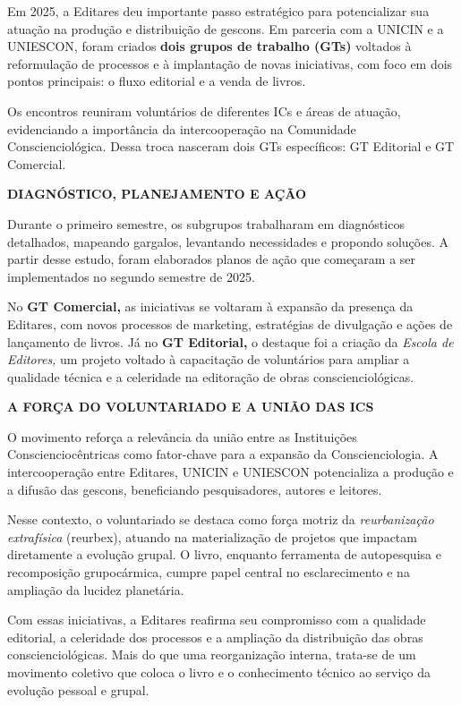 \documentclass[
]{article}
\begin{document}
Em 2025, a Editares deu importante passo estratégico para potencializar sua atuação na produção e distribuição de gescons. Em parceria com a UNICIN e a UNIESCON, foram criados \textbf{dois grupos de trabalho (GTs)} voltados à reformulação de processos e à implantação de novas iniciativas, com foco em dois pontos principais: o fluxo editorial e a venda de livros.

Os encontros reuniram voluntários de diferentes ICs e áreas de atuação, evidenciando a importância da intercooperação na Comunidade Conscienciológica. Dessa troca nasceram dois GTs específicos: GT Editorial e GT Comercial.

\textbf{DIAGNÓSTICO, PLANEJAMENTO E AÇÃO}

Durante o primeiro semestre, os subgrupos trabalharam em diagnósticos detalhados, mapeando gargalos, levantando necessidades e propondo soluções. A partir desse estudo, foram elaborados planos de ação que começaram a ser implementados no segundo semestre de 2025.

No \textbf{GT Comercial,} as iniciativas se voltaram à expansão da presença da Editares, com novos processos de marketing, estratégias de divulgação e ações de lançamento de livros. Já no \textbf{GT Editorial,} o destaque foi a criação da \emph{Escola de Editores,} um projeto voltado à capacitação de voluntários para ampliar a qualidade técnica e a celeridade na editoração de obras conscienciológicas.

\textbf{A FORÇA DO VOLUNTARIADO E A UNIÃO DAS ICS}

O movimento reforça a relevância da união entre as Instituições Conscienciocêntricas como fator-chave para a expansão da Conscienciologia. A intercooperação entre Editares, UNICIN e UNIESCON potencializa a produção e a difusão das gescons, beneficiando pesquisadores, autores e leitores.

Nesse contexto, o voluntariado se destaca como força motriz da \emph{reurbanização extrafísica} (reurbex), atuando na materialização de projetos que impactam diretamente a evolução grupal. O livro, enquanto ferramenta de autopesquisa e recomposição grupocármica, cumpre papel central no esclarecimento e na ampliação da lucidez planetária.

Com essas iniciativas, a Editares reafirma seu compromisso com a qualidade editorial, a celeridade dos processos e a ampliação da distribuição das obras conscienciológicas. Mais do que uma reorganização interna, trata-se de um movimento coletivo que coloca o livro e o conhecimento técnico ao serviço da evolução pessoal e grupal.
\end{document}
